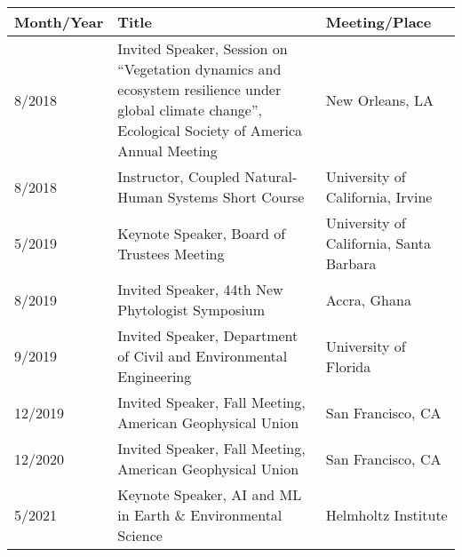 
\begin{longtable}{lp{10.0cm}p{4.5cm}}
Month/Year & Title & Meeting/Place\\
\hline 
\endhead 
8/2018 & Invited Speaker, Session on ``Vegetation dynamics and ecosystem resilience under global climate change'', Ecological Society of America Annual Meeting & New Orleans, LA \\
8/2018 & Instructor, Coupled Natural-Human Systems Short Course & University of California, Irvine \\
5/2019 & Keynote Speaker, Board of Trustees Meeting & University of California, Santa Barbara \\
8/2019 & Invited Speaker, 44th New Phytologist Symposium & Accra, Ghana \\
9/2019 & Invited Speaker, Department of Civil and Environmental Engineering & University of Florida \\
12/2019 & Invited Speaker, Fall Meeting, American Geophysical Union & San Francisco, CA \\
12/2020 & Invited Speaker, Fall Meeting, American Geophysical Union & San Francisco, CA \\
5/2021 & Keynote Speaker, AI and ML in Earth \& Environmental Science & Helmholtz Institute \\
\end{longtable}


